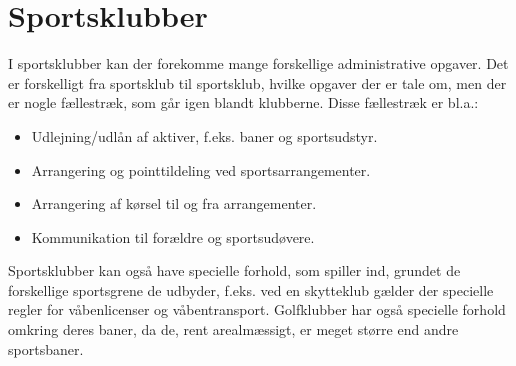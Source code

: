 \section{Sportsklubber} \label{Sportsklubber}

I sportsklubber kan der forekomme mange forskellige administrative opgaver. 
Det er forskelligt fra sportsklub til sportsklub, hvilke opgaver der er tale om, men der er nogle fællestræk, som går igen blandt klubberne. 
Disse fællestræk er bl.a.:
\begin{itemize}
	\item Udlejning/udlån af aktiver, f.eks. baner og sportsudstyr. 
	\item Arrangering og pointtildeling ved sportsarrangementer.
	\item Arrangering af kørsel til og fra arrangementer.
	\item Kommunikation til forældre og sportsudøvere.
\end{itemize}

Sportsklubber kan også have specielle forhold, som spiller ind, grundet de forskellige sportsgrene de udbyder, f.eks. ved en skytteklub gælder der specielle regler for våbenlicenser og våbentransport.
Golfklubber har også specielle forhold omkring deres baner, da de, rent arealmæssigt, er meget større end andre sportsbaner. 







